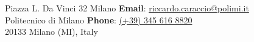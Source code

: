 Piazza L. Da Vinci 32 Milano \hfill \textbf{Email}:
\href{mailto:riccardo.caraccio@polimi.it}{riccardo.caraccio@polimi.it}\\
Politecnico di Milano \hfill \textbf{Phone}: \href{tel:+393456168820}{(+39)
345 616 8820}\\
20133 Milano (MI), Italy  \hfill 
